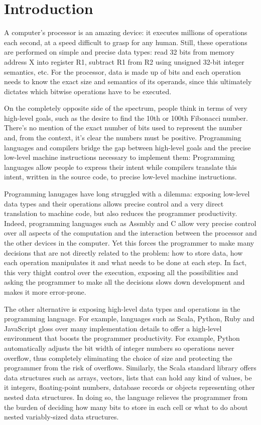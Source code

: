 \chapter{Introduction}

A computer's processor is an amazing device: it executes millions of operations each second, at a speed difficult to grasp for any human. Still, these operations are performed on simple and precise data types: read 32 bits from memory address X into register R1, subtract R1 from R2 using unsigned 32-bit integer semantics, etc. For the processor, data is made up of bits and each operation needs to know the exact size and semantics of its operands, since this ultimately dictates which bitwise operations have to be executed.

On the completely opposite side of the spectrum, people think in terms of very high-level goals, such as the desire to find the 10th or 100th Fibonacci number. There's no mention of the exact number of bits used to represent the number and, from the context, it's clear the numbers must be positive. Programming languages and compilers bridge the gap between high-level goals and the precise low-level machine instructions necessary to implement them: Programming languages allow people to express their intent while compilers translate this intent, written in the source code, to precise low-level machine instructions.

Programming lanugages have long struggled with a dilemma: exposing low-level data types and their operations allows precise control and a very direct translation to machine code, but also reduces the programmer productivity. Indeed, programming languages such as Assmbly and C allow very precise control over all aspects of the computation and the interaction between the processor and the other devices in the computer. Yet this forces the programmer to make many decisions that are not directly related to the problem: how to store data, how each operation manipulates it and what needs to be done at each step. In fact, this very thight control over the execution, exposing all the possibilities and asking the programmer to make all the decisions slows down  development and makes it more error-prone.

The other alternative is exposing high-level data types and operations in the programming language. For example, languages such as Scala, Python, Ruby and JavaScript gloss over many implementation details to offer a high-level environment that boosts the programmer productivity. For example, Python automatically adjusts the bit width of integer numbers so operations never overflow, thus completely eliminating the choice of size and protecting the programmer from the risk of overflows. Similarly, the Scala standard library offers data structures such as arrays, vectors, lists that can hold any kind of values, be it integers, floating-point numbers, database records or objects representing other nested data structures. In doing so, the language relieves the programmer from the burden of deciding how many bits to store in each cell or what to do about nested variably-sized data structures.

